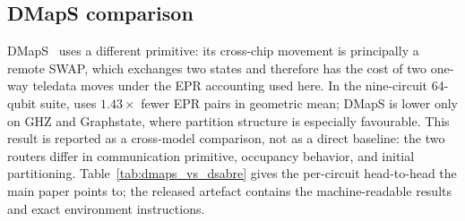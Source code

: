 \begin{table}[t]
\centering
\caption{{Entanglement-lifetime sensitivity on the 64q suite:
  \texttt{pytket-dqc} e-bits when one EPR pair may serve at most
  $D_{\max}$ gates (counter as described in the text).  The
  distributions scored are the ones Table~\ref{tab:fair} reports, loaded
  from disk rather than searched afresh, so the $D_{\max}{=}\infty$
  column \emph{is} that table's \texttt{pytket-dqc} column and the
  counter reproduces its cost exactly, circuit by circuit.  \dSABRE{}
  EPR (Table~\ref{tab:main}) is $D_{\max}$-invariant.
  $\Delta_{3}$ compares \dSABRE{} against the $D_{\max}{=}3$ column;
  negative favours \dSABRE{}.}}
\label{tab:dmax}
\setlength{\tabcolsep}{3pt}
\small
{}
\end{table}

\subsection{DMapS comparison}
\label{app:dmaps}
DMapS~\cite{luo2025dmaps} uses a different primitive: its cross-chip movement
is principally a remote SWAP, which exchanges two states and therefore has the
cost of two one-way teledata moves under the EPR accounting used here.  In the nine-circuit
64-qubit suite, \dSABRE{} uses $1.43\times$ fewer EPR pairs in geometric mean;
DMapS is lower only on GHZ and Graphstate, where partition structure is
especially favourable.  This result is reported as a cross-model comparison,
not as a direct baseline: the two routers differ in communication primitive,
occupancy behavior, and initial partitioning.  Table~\ref{tab:dmaps_vs_dsabre} gives the per-circuit head-to-head the main
paper points to; the released artefact contains the machine-readable results
and exact environment instructions.

